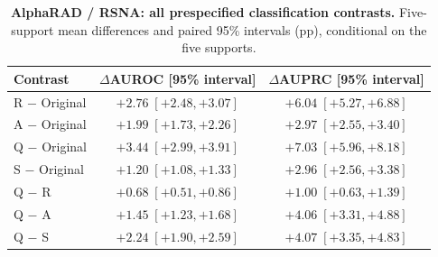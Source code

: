 \begin{table}[tp]
\centering
\caption{\textbf{AlphaRAD / RSNA: all prespecified classification contrasts.} Five-support mean differences and paired 95\% intervals (pp), conditional on the five supports.}
\label{tab:supp-path-ci-rsna_pneumonia}
\footnotesize
\setlength{\tabcolsep}{4pt}
\begin{tabular*}{\textwidth}{@{\extracolsep{\fill}}lcc@{}}
\toprule
Contrast & $\Delta$AUROC [95\% interval] & $\Delta$AUPRC [95\% interval] \\
\midrule
R $-$ Original & $+2.76\;[+2.48,+3.07]$ & $+6.04\;[+5.27,+6.88]$ \\
A $-$ Original & $+1.99\;[+1.73,+2.26]$ & $+2.97\;[+2.55,+3.40]$ \\
Q $-$ Original & $+3.44\;[+2.99,+3.91]$ & $+7.03\;[+5.96,+8.18]$ \\
S $-$ Original & $+1.20\;[+1.08,+1.33]$ & $+2.96\;[+2.56,+3.38]$ \\
Q $-$ R & $+0.68\;[+0.51,+0.86]$ & $+1.00\;[+0.63,+1.39]$ \\
Q $-$ A & $+1.45\;[+1.23,+1.68]$ & $+4.06\;[+3.31,+4.88]$ \\
Q $-$ S & $+2.24\;[+1.90,+2.59]$ & $+4.07\;[+3.35,+4.83]$ \\
\bottomrule
\end{tabular*}
\end{table}
